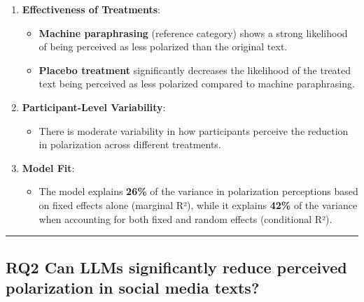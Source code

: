 \documentclass[
]{article}
\providecommand{\tightlist}{%
  \setlength{\itemsep}{0pt}\setlength{\parskip}{0pt}}
\begin{document}
\begin{enumerate}
\def\labelenumi{\arabic{enumi}.}
\tightlist
\item
  \textbf{Effectiveness of Treatments}:

  \begin{itemize}
  \tightlist
  \item
    \textbf{Machine paraphrasing} (reference category) shows a strong
    likelihood of being perceived as less polarized than the original
    text.
  \item
    \textbf{Placebo treatment} significantly decreases the likelihood of
    the treated text being perceived as less polarized compared to
    machine paraphrasing.
  \end{itemize}
\item
  \textbf{Participant-Level Variability}:

  \begin{itemize}
  \tightlist
  \item
    There is moderate variability in how participants perceive the
    reduction in polarization across different treatments.
  \end{itemize}
\item
  \textbf{Model Fit}:

  \begin{itemize}
  \tightlist
  \item
    The model explains \textbf{26\%} of the variance in polarization
    perceptions based on fixed effects alone (marginal R²), while it
    explains \textbf{42\%} of the variance when accounting for both
    fixed and random effects (conditional R²).
  \end{itemize}
\end{enumerate}

\begin{center}\rule{0.5\linewidth}{0.5pt}\end{center}

\subsection{\texorpdfstring{\textbf{RQ2} Can LLMs significantly reduce
perceived polarization in social media
texts?}{RQ2 Can LLMs significantly reduce perceived polarization in social media texts?}}\label{rq2-can-llms-significantly-reduce-perceived-polarization-in-social-media-texts}
\end{document}

